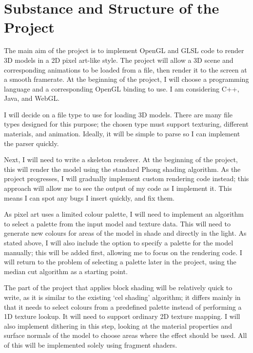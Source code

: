 \documentclass[12pt,twoside,notitlepage]{report}
\begin{document}
\section*{Substance and Structure of the Project}

The main aim of the project is to implement OpenGL and GLSL code to render 3D models in a 2D pixel art-like style. The project will allow a 3D scene and corresponding animations to be loaded from a file, then render it to the screen at a smooth framerate. At the beginning of the project, I will choose a programming language and a corresponding OpenGL binding to use. I am considering C++, Java, and WebGL.

I will decide on a file type to use for loading 3D models. There are many file types designed for this purpose; the chosen type must support texturing, different materials, and animation. Ideally, it will be simple to parse so I can implement the parser quickly.

Next, I will need to write a skeleton renderer. At the beginning of the project, this will render the model using the standard Phong shading algorithm. As the project progresses, I will gradually implement custom rendering code instead; this approach will allow me to see the output of my code as I implement it. This means I can spot any bugs I insert quickly, and fix them.

As pixel art uses a limited colour palette, I will need to implement an algorithm to select a palette from the input model and texture data. This will need to generate new colours for areas of the model in shade and directly in the light. As stated above, I will also include the option to specify a palette for the model manually; this will be added first, allowing me to focus on the rendering code. I will return to the problem of selecting a palette later in the project, using the median cut algorithm as a starting point.

The part of the project that applies block shading will be relatively quick to write, as it is similar to the existing `cel shading' algorithm; it differs mainly in that it needs to select colours from a predefined palette instead of performing a 1D texture lookup. It will need to support ordinary 2D texture mapping. I will also implement dithering in this step, looking at the material properties and surface normals of the model to choose areas where the effect should be used. All of this will be implemented solely using fragment shaders.
\end{document}
